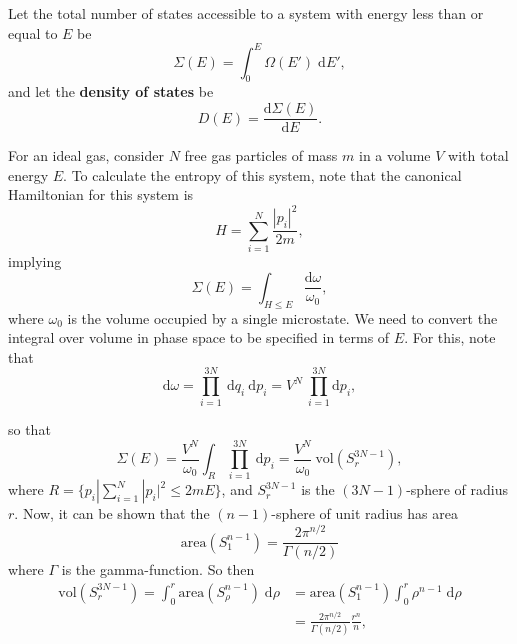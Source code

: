 \documentclass[letter-paper]{tufte-book}
\newenvironment{example}[1][Example]{\begin{trivlist}
\item[\hskip \labelsep {\bfseries #1}]}{\end{trivlist}}
\newcommand\Def[1]{\textbf{#1}}
\begin{document}
Let the total number of states accessible to a system with energy less than or
equal to $E$ be
\begin{equation*}
  \Sigma (E) = \int_0^E \Omega(E')\; \mathrm{d}E',
\end{equation*}
and let the \Def{density of states} be
\begin{equation}
  D(E) = \frac{\mathrm{d}\Sigma(E)}{\mathrm{d}E}.
\end{equation}

\begin{example}
For an ideal gas, consider $N$ free gas particles of mass $m$ in a volume $V$
with total energy $E$. To calculate the entropy of this system, note that the
canonical Hamiltonian for this system is
\begin{equation*}
  H = \sum_{i=1}^N \frac{|p_i|^2}{2m},
\end{equation*}
implying
\begin{equation*}
  \Sigma(E) = \int_{H \leq E} \frac{\mathrm{d}\omega}{\omega_0},
\end{equation*}
where $\omega_0$ is the volume occupied by a single microstate. We
need to convert the integral over volume in phase space to be specified in terms
of $E$. For this, note that
\begin{equation*}
  \mathrm{d}\omega = \prod^{3N}_{i=1}\ \mathrm{d}q_i\ \mathrm{d}p_i = V^N\ \prod^{3N}_{i=1}\mathrm{d}p_i,
\end{equation*}
\end{example}
so that
\begin{equation*}
  \Sigma(E) = \frac{V^N}{\omega_0} \int_R \prod^{3N}_{i=1}\ \mathrm{d}p_i = \frac{V^N}{\omega_0}\ \mbox{vol}\left(S_r^{3N-1}\right),
\end{equation*}
where $R = \{ p_i | \sum^N_{i=1} |p_i|^2 \leq 2m E\}$, and $S_r^{3N-1}$ is the
$(3N-1)$-sphere of radius $r$. Now, it can be shown that the $(n-1)$-sphere of
unit radius has area
\begin{equation*}
 \mbox{area}\left(S_1^{n-1}\right) = \frac{2\pi^{n/2}}{\Gamma(n/2)}
\end{equation*}
where $\Gamma$ is the gamma-function. So then
\begin{align*}
  \mbox{vol}\left(S_r^{3N-1}\right) = \int_0^r \mbox{area}\left(S_\rho^{n-1}\right)\; \mathrm{d}\rho &= \mbox{area}\left(S_1^{n-1}\right) \int_0^r \rho^{n-1}\; \mathrm{d}\rho \\
    &= \frac{2\pi^{n/2}}{\Gamma(n/2)}\frac{r^n}{n},
\end{align*}
\end{document}
